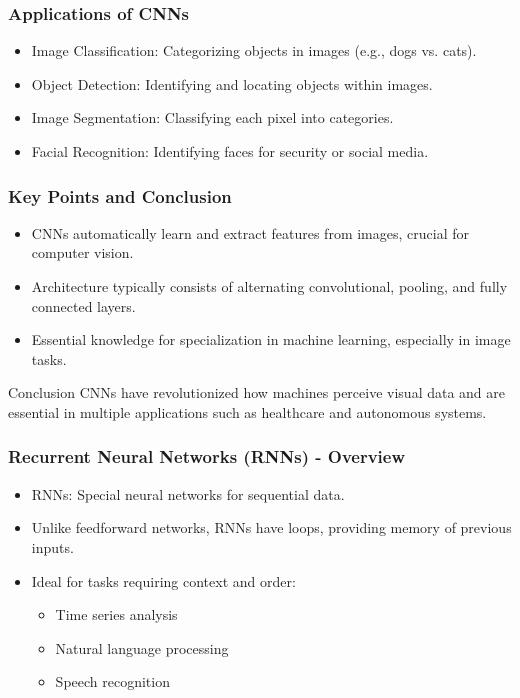 \documentclass[aspectratio=169]{beamer}
\begin{document}
\begin{frame}[fragile]
    \frametitle{Applications of CNNs}
    \begin{itemize}
        \item Image Classification: Categorizing objects in images (e.g., dogs vs. cats).
        \item Object Detection: Identifying and locating objects within images.
        \item Image Segmentation: Classifying each pixel into categories.
        \item Facial Recognition: Identifying faces for security or social media.
    \end{itemize}
\end{frame}

\begin{frame}[fragile]
    \frametitle{Key Points and Conclusion}
    \begin{itemize}
        \item CNNs automatically learn and extract features from images, crucial for computer vision.
        \item Architecture typically consists of alternating convolutional, pooling, and fully connected layers.
        \item Essential knowledge for specialization in machine learning, especially in image tasks.
    \end{itemize}
    
    \begin{block}{Conclusion}
        CNNs have revolutionized how machines perceive visual data and are essential in multiple applications such as healthcare and autonomous systems.
    \end{block}
\end{frame}

\begin{frame}[fragile]
    \frametitle{Recurrent Neural Networks (RNNs) - Overview}
    \begin{itemize}
        \item RNNs: Special neural networks for sequential data.
        \item Unlike feedforward networks, RNNs have loops, providing memory of previous inputs.
        \item Ideal for tasks requiring context and order:
        \begin{itemize}
            \item Time series analysis
            \item Natural language processing
            \item Speech recognition
        \end{itemize}
    \end{itemize}
\end{frame}
\end{document}
